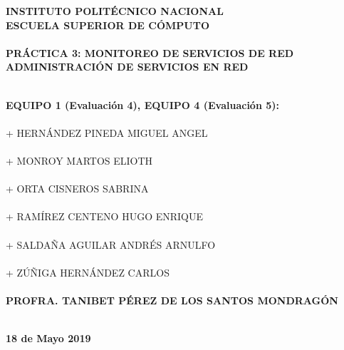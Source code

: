 \newpage
\begin{center}
\thispagestyle{empty}
\LARGE{\textsc {\textbf{INSTITUTO POLITÉCNICO NACIONAL}}}\\[0.5cm]
\Large{\textbf{ESCUELA SUPERIOR DE CÓMPUTO}}\\[0.7cm]
\vspace*{2cm}
\LARGE{\textbf{\\PRÁCTICA 3: MONITOREO DE SERVICIOS DE RED\\}}
\vspace*{1cm}
\Large{\textbf{ADMINISTRACIÓN DE SERVICIOS EN RED\\}}
\vspace*{2cm}
\end{center}
\large{\textbf{\\EQUIPO 1 (Evaluación 4), EQUIPO 4 (Evaluación 5):}}\\
\vspace*{.5cm}
\large{\textsc{\\+ HERNÁNDEZ PINEDA MIGUEL ANGEL}}\\
\large{\textsc{\\+ MONROY MARTOS ELIOTH}}\\
\large{\textsc{\\+ ORTA CISNEROS SABRINA}}\\
\large{\textsc{\\+ RAMÍREZ CENTENO HUGO ENRIQUE}}\\
\large{\textsc{\\+ SALDAÑA AGUILAR ANDRÉS ARNULFO}}\\
\large{\textsc{\\+ ZÚÑIGA HERNÁNDEZ CARLOS}}\\
\vspace*{0.5cm}
\large{\textbf{\\PROFRA. TANIBET PÉREZ DE LOS SANTOS MONDRAGÓN}}\\
\vspace*{0.5cm}
\begin{flushright}
\Large{\textbf{\\18 de Mayo 2019}}
\end{flushright}
\newpage